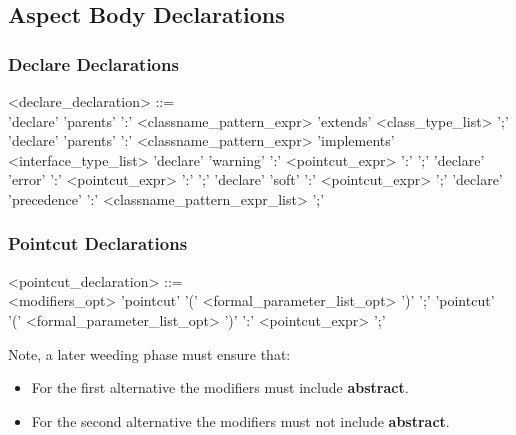 \subsection{Aspect Body Declarations}

\subsubsection{Declare Declarations}

\begin{minipage}{6in}
\begin{grammar}
<declare_declaration> ::= \hspace{1in} \\
       'declare' 'parents' ':' {\blue <classname_pattern_expr>} 'extends' 
           {\red <class_type_list>} ';' 
\alt   'declare' 'parents' ':' {\blue <classname_pattern_expr>} 'implements'
           {\red <interface_type_list>}
\alt   'declare' 'warning' ':' {\blue <pointcut_expr>} ':'
                                            {} ';'
\alt   'declare' 'error' ':' {\blue <pointcut_expr>} ':' 
                                            {} ';'
\alt   'declare' 'soft' ':' {\blue <pointcut_expr>} ';'
\alt   'declare' 'precedence' ':' {\blue <classname_pattern_expr_list>} ';'
\end{grammar}
\end{minipage}

\subsubsection{Pointcut Declarations}

\begin{minipage}{6in}
\begin{grammar}
<pointcut_declaration> ::= \hspace{1in} \\
      {\red <modifiers_opt>} 'pointcut' {} 
             '(' {\red <formal_parameter_list_opt>} ')' ';'
 'pointcut' {} 
             '(' {\red <formal_parameter_list_opt>} ')' 
             ':' {\blue <pointcut_expr>} ';'
\end{grammar}
\end{minipage}

\noindent Note, a later weeding phase must ensure that:
\begin{itemize}
\item For the first alternative the modifiers must include {\bf abstract}.
\item For the second alternative the modifiers must not include {\bf abstract}.
\end{itemize}

